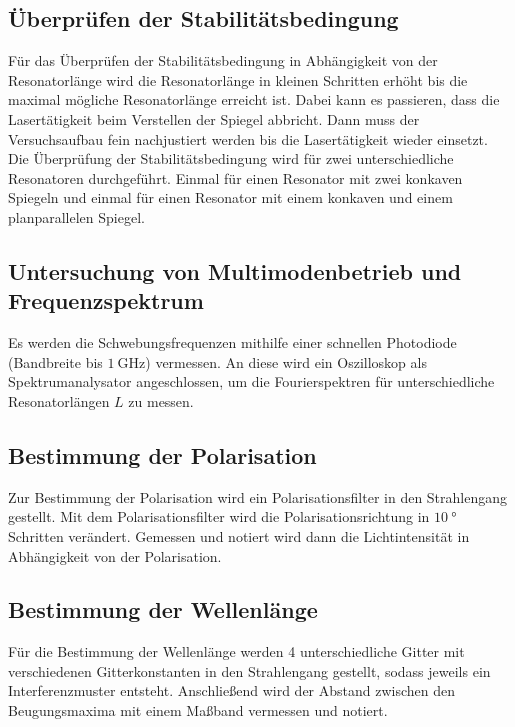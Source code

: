 \subsection{Überprüfen der Stabilitätsbedingung}
Für das Überprüfen der Stabilitätsbedingung in Abhängigkeit von der Resonatorlänge wird die Resonatorlänge in kleinen Schritten erhöht bis die maximal mögliche Resonatorlänge erreicht ist. Dabei kann es passieren, dass die Lasertätigkeit beim Verstellen der Spiegel abbricht. Dann muss der Versuchsaufbau fein nachjustiert werden bis die Lasertätigkeit wieder einsetzt. Die Überprüfung der Stabilitätsbedingung wird für zwei unterschiedliche Resonatoren durchgeführt. Einmal für einen Resonator mit zwei konkaven Spiegeln und einmal für einen Resonator mit einem konkaven und einem planparallelen Spiegel.

\subsection{Untersuchung von Multimodenbetrieb und Frequenzspektrum}
Es werden die Schwebungsfrequenzen mithilfe einer schnellen Photodiode (Bandbreite bis $\SI{1}{\giga\hertz}$) vermessen. An diese wird ein Oszilloskop als Spektrumanalysator angeschlossen, um die Fourierspektren für unterschiedliche Resonatorlängen $L$ zu messen.

\subsection{Bestimmung der Polarisation}
Zur Bestimmung der Polarisation wird ein Polarisationsfilter in den Strahlengang gestellt. Mit dem Polarisationsfilter wird die Polarisationsrichtung in $\SI{10}{\degree}$ Schritten verändert. Gemessen und notiert wird dann die Lichtintensität in Abhängigkeit von der Polarisation.

\subsection{Bestimmung der Wellenlänge}
Für die Bestimmung der Wellenlänge werden 4 unterschiedliche Gitter mit verschiedenen Gitterkonstanten in den Strahlengang gestellt, sodass jeweils ein Interferenzmuster entsteht. Anschließend wird der Abstand zwischen den Beugungsmaxima mit einem Maßband vermessen und notiert.